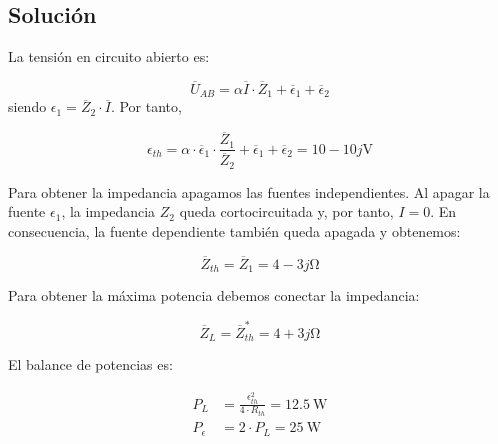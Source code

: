 \subsection*{Solución}

La tensión en circuito abierto es:

\begin{equation*}
  \overline{U}_{AB} = \alpha \overline{I} \cdot \overline{Z}_1 + \overline{\epsilon}_1 + \overline{\epsilon}_2
\end{equation*}
siendo $\epsilon_1 = \overline{Z}_2 \cdot \overline{I}$. Por tanto,

\begin{equation*}
  \epsilon_{th}  = \alpha \cdot \overline{\epsilon}_1 \cdot \frac{\overline{Z}_1}{\overline{Z}_2} + \overline{\epsilon}_1 + \overline{\epsilon}_2 = 10 - 10j \si{\volt}
\end{equation*}

Para obtener la impedancia apagamos las fuentes independientes. Al apagar la fuente $\epsilon_1$, la impedancia $Z_2$ queda cortocircuitada y, por tanto, $I = 0$. En consecuencia, la fuente dependiente también queda apagada y obtenemos:

\begin{equation*}
  \overline{Z}_{th} = \overline{Z}_1 = 4 - 3j \si{\ohm}
\end{equation*}

Para obtener la máxima potencia debemos conectar la impedancia:

\begin{equation*}
  \overline{Z}_{L} = \overline{Z}^*_{th} = 4 + 3j \si{\ohm}
\end{equation*}

El balance de potencias es:

\begin{align*}
  P_L &= \frac{\epsilon_{th}^2}{4 \cdot R_{th}} = \SI{12.5}{\watt}\\
  P_{\epsilon} &= 2 \cdot P_L = \SI{25}{\watt} 
\end{align*}


